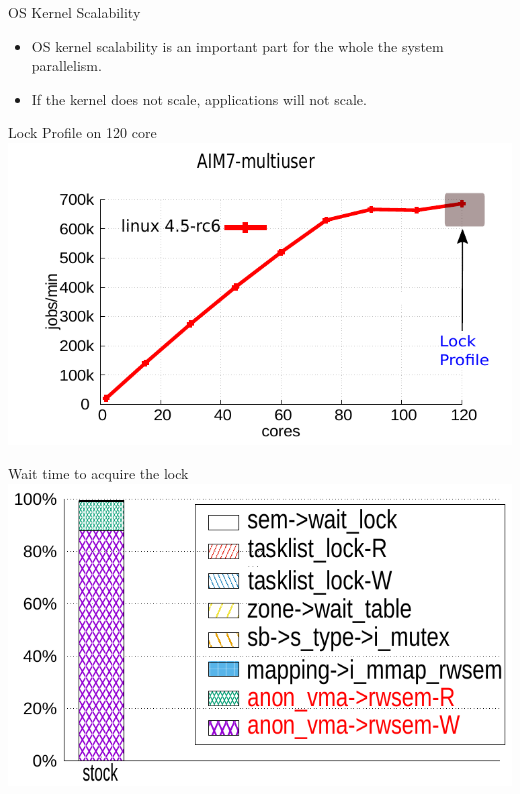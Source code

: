 \documentclass[english]{beamer} %
\begin{document}
\begin{frame}{OS Kernel Scalability}
    \begin{itemize}[<+-| alert@+>]
    \item OS kernel scalability is an important part for the whole the system
    parallelism.
    \item If the kernel does not scale, applications will not scale.
    \end{itemize}
\end{frame}


\begin{frame}{Lock Profile on 120 core}
\includegraphics[scale=0.8]{graph/aim7_default_4}
\end{frame}


\begin{frame}{Wait time to acquire the lock}
\includegraphics[scale=0.8]{fig/lockstat}
\end{frame}
\end{document}
